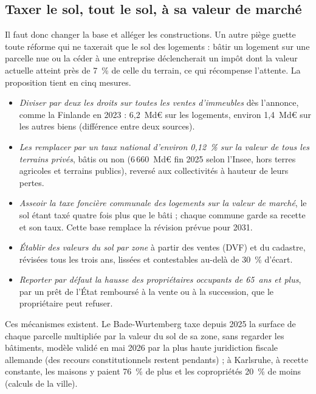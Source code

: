 
\subsection{Taxer le sol, tout le sol, à sa valeur de marché}

Il faut donc changer la base et alléger les constructions. Un autre piège guette toute réforme qui ne taxerait
que le sol des logements : bâtir un logement sur une parcelle nue ou la céder à une entreprise déclencherait un impôt
dont la valeur actuelle atteint près de 7~\% de celle du terrain, ce qui récompense l'attente. La proposition tient en
cinq mesures.
\begin{itemize}\setlength{\itemsep}{0pt}
\item \emph{Diviser par deux les droits sur toutes les ventes d'immeubles} dès l'annonce, comme la Finlande en 2023 :
6,2~Md€ sur les logements, environ 1,4~Md€ sur les autres biens (différence entre deux sources).
\item \emph{Les remplacer par un taux national d'environ 0,12~\% sur la valeur de tous les terrains privés}, bâtis ou
non (6\,660~Md€ fin 2025 selon l'Insee, hors terres agricoles et terrains publics), reversé aux collectivités à hauteur
de leurs pertes.
\item \emph{Asseoir la taxe foncière communale des logements sur la valeur de marché}, le sol étant taxé quatre fois
plus que le bâti ; chaque commune garde sa recette et son taux. Cette base remplace la révision prévue pour 2031.
\item \emph{Établir des valeurs du sol par zone} à partir des ventes (DVF) et du cadastre, révisées tous les trois ans,
lissées et contestables au-delà de 30~\% d'écart.
\item \emph{Reporter par défaut la hausse des propriétaires occupants de 65~ans et plus}, par un prêt de l'État
remboursé à la vente ou à la succession, que le propriétaire peut refuser.
\end{itemize}

Ces mécanismes existent. Le Bade-Wurtemberg taxe depuis 2025 la surface de chaque parcelle multipliée par la valeur du
sol de sa zone, sans regarder les bâtiments, modèle validé en mai 2026 par la plus haute juridiction fiscale allemande
(des recours constitutionnels restent pendants) ; à Karlsruhe, à recette constante, les maisons y paient 76~\% de plus
et les copropriétés 20~\% de moins (calculs de la ville).

